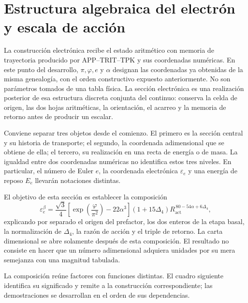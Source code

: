 \section{Estructura algebraica del electrón y escala de acción}
\label{sec:electron}

La construcción electrónica recibe el estado aritmético con memoria de
trayectoria producido por APP--TRIT--TPK y sus coordenadas numéricas. En este punto del desarrollo,
\(\pi,\varphi,e\) y \(\alpha\) designan las coordenadas ya obtenidas de
la misma genealogía, con el orden constructivo expuesto anteriormente. No
son parámetros tomados de una tabla física. La sección electrónica es una
realización posterior de esa estructura discreta conjunta del continuo:
conserva la celda de origen, las dos hojas aritméticas, la orientación, el
acarreo y la memoria de retorno antes de producir un escalar.

Conviene separar tres objetos desde el comienzo. El primero es la sección
central y su historia de transporte; el segundo, la coordenada
adimensional que se obtiene de ella; el tercero, su realización en una
recta de energía o de masa. La igualdad entre dos coordenadas numéricas no
identifica estos tres niveles. En particular, el número de Euler \(e\),
la coordenada electrónica \(\varepsilon_e\) y una energía de reposo
\(E_e\) llevarán notaciones distintas.

El objetivo de esta sección es establecer la composición
\begin{equation}
 \varepsilon_e^{\beta}
 =\frac{\sqrt3}{4}
  \left[\exp\!\left(\frac{\varphi}{\pi^2}\right)-22\alpha^3\right]
  (1+15\Delta_4)
  R_{\mathrm{act}}^{\,80-54\alpha+6\Delta_4},
 \label{eq:el-formula-completa}
\end{equation}
explicando por separado el origen del prefactor, los dos enteros de la
etapa basal, la normalización de \(\Delta_4\), la razón de acción y el
triple de retorno. La carta dimensional se abre solamente después de
esta composición. El resultado no consiste en hacer que un número
adimensional adquiera unidades por su mera semejanza con una magnitud
tabulada.

La composición reúne factores con funciones distintas. El cuadro
siguiente identifica su significado y remite a la construcción
correspondiente; las demostraciones se desarrollan en el orden de sus
dependencias.

